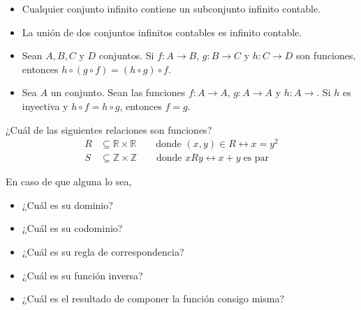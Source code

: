 \documentclass[oneside]{style}
\begin{document}
\begin{questions}[label=\protect\circled{\bfseries\arabic*}]

    \begin{itemize}
        \item Cualquier conjunto infinito contiene un subconjunto 
        infinito contable. 

        \item La unión de dos conjuntos infinitos contables es infinito 
        contable. 
    \end{itemize}

    \begin{itemize}
        \item Sean $A, B, C$ y $D$ conjuntos. Si $f: A \rightarrow B$,  
        $g:B \rightarrow C$ y $h: C \rightarrow D$ son funciones, 
        entonces $h \circ (g \circ f) = (h \circ g) \circ f$.  

        \item Sea $A$ un conjunto. Sean las funciones $f: A \rightarrow A$, 
        $g: A \rightarrow A$ y $h: A \rightarrow$. Si $h$ es inyectiva y 
        $h \circ f = h \circ g$, entonces $f = g$. 
    \end{itemize}


    \question
    {
        ¿Cuál de las siguientes relaciones son funciones?
        \begin{align*}
            R &\subseteq \mathbb{R} \times \mathbb{R} \quad \quad \text{donde }
            (x,y) \in R \leftrightarrow x = y^2 \\ 
            S &\subseteq \mathbb{Z} \times \mathbb{Z} \quad \quad \text{donde }
            xRy \leftrightarrow x+y \; \text{es par}
        \end{align*}

        En caso de que alguna lo sea,
        \begin{itemize}
            \item ¿Cuál es su dominio?
            \item ¿Cuál es su codominio?
            \item ¿Cuál es su regla de correspondencia?
            \item ¿Cuál es su función inversa?
            \item ¿Cuál es el resultado de componer la función consigo misma?
        \end{itemize}
    }


\end{questions}
\end{document}
